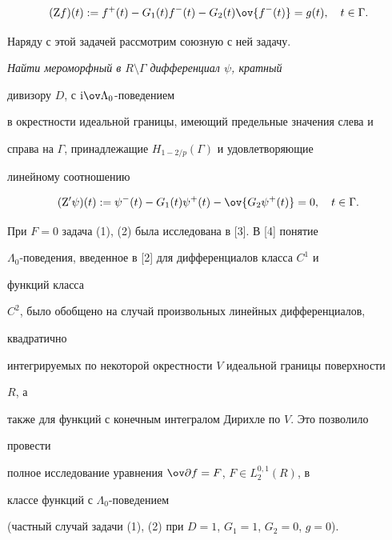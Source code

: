 \begin{equation} 


({\mathrm Z}f)(t):=f^+(t)-G_1(t)f^-(t)-G_2(t) 


\ov{f^-(t)}=g(t),\quad t\in\Gamma. 


\end{equation} 


 


Наряду с этой задачей рассмотрим союзную с ней задачу. 


 


{\it Найти мероморфный в $R\setminus\Gamma$ дифференциал $\psi$, кратный 


дивизору $D$, с ${\mathrm i}\ov\Lambda_0$-поведением 


в окрестности идеальной границы, имеющий предельные значения слева и 


справа на $\Gamma$, принадлежащие $H_{1-2/p}(\Gamma)$ и удовлетворяющие 


линейному соотношению} 


\begin{equation} 


({\mathrm Z}'\psi)(t):=\psi^-(t)-G_1(t)\psi^+(t)- 


\ov{G_2\psi^+(t)}=0,\quad t\in\Gamma. 


\end{equation} 


 


При $F=0$ задача (1), (2) была исследована в [3]. В [4] понятие 


$\Lambda_0$-поведения, введенное в [2] для дифференциалов класса $C^1$ и 


функций класса 


$C^2$, было обобщено на случай произвольных линейных дифференциалов, 


квадратично 


интегрируемых по некоторой окрестности $V$ идеальной границы поверхности 


$R$, а 


также для функций с конечным интегралом Дирихле по $V$. Это позволило 


провести 


полное исследование уравнения $\ov\partial f=F$, $F\in L^{0,1}_2(R)$, в 


классе функций с $\Lambda_0$-поведением 


(частный случай задачи (1), (2) при $D=1$, $G_1=1$, $G_2=0$, $g=0$). 


